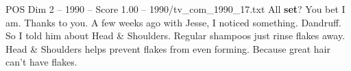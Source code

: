 \begin{textsample}{POS Dim 2 – 1990 – Score 1.00 – 1990/tv\_com\_1990\_17.txt}  \label{ex:f2_pos_037}
All \textbf{set}?
You bet I am.
Thanks to you.
A few weeks ago with Jesse, I noticed something.
Dandruff.
So I told him about Head \& Shoulders.
Regular shampoos just rinse flakes away.
Head \& Shoulders helps prevent flakes from even forming.
Because great hair can't have flakes.

\end{textsample}
